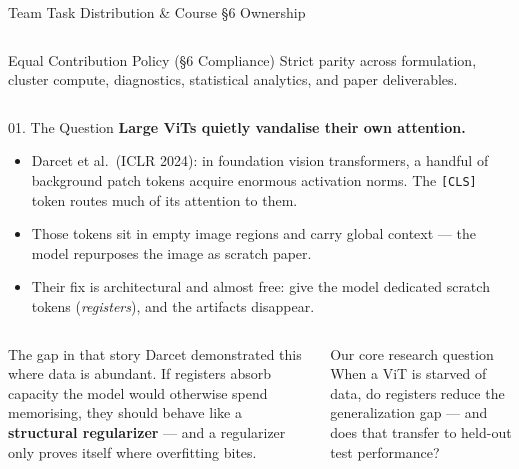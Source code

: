 \documentclass[aspectratio=169]{beamer}
\begin{document}
\begin{frame}{Team Task Distribution \& Course §6 Ownership}
\begin{columns}[T]
\begin{exampleblock}{Equal Contribution Policy (§6 Compliance)}
\scriptsize Strict parity across formulation, cluster compute, diagnostics, statistical analytics, and paper deliverables.
\end{exampleblock}
\end{columns}
\end{frame}

\begin{frame}{01. The Question}
\small
\textbf{Large ViTs quietly vandalise their own attention.}
\begin{itemize}\itemsep=1pt
\item Darcet et al.\ (ICLR 2024): in foundation vision transformers, a handful of background patch tokens acquire enormous activation norms. The \texttt{[CLS]} token routes much of its attention to them.
\item Those tokens sit in empty image regions and carry global context --- the model repurposes the image as scratch paper.
\item Their fix is architectural and almost free: give the model dedicated scratch tokens (\emph{registers}), and the artifacts disappear.
\end{itemize}

\smallskip
\begin{columns}[T]
\begin{block}{The gap in that story}
Darcet demonstrated this where data is abundant. If registers absorb capacity the model would otherwise spend memorising, they should behave like a \textbf{structural regularizer} --- and a regularizer only proves itself where overfitting bites.
\end{block}

\begin{alertblock}{Our core research question}
When a ViT is starved of data, do registers reduce the generalization gap --- and does that transfer to held-out test performance?
\end{alertblock}
\end{columns}
\end{frame}
\end{document}
